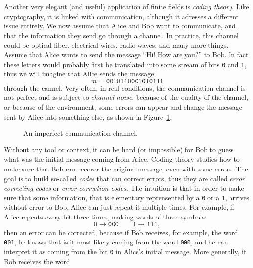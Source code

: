 Another very elegant (and useful) application of finite fields is
\emph{coding theory}. Like cryptography, it is linked with communication,
although it adresses a different issue entirely. We now assume that Alice and
Bob want to communicate, and that the information they send go through a
channel. In practice, this channel could be optical fiber, electrical wires, radio
waves, and many more things. Assume that Alice wants to send the message ``Hi!
How are you?'' to Bob. In fact these letters would probably first be translated
into some stream of bits \texttt{0} and \texttt{1}, thus we will imagine that
Alice sends the message
\[
  m = \texttt{0010110001010111}
\]
through the cannel. Very often, in real conditions, the communication channel is
not perfect and is subject to \emph{channel noise}, \ie because of the quality of
the channel, or because of the environment, some errors can appear and change
the message sent by Alice into something else, as shown in
Figure~\ref{fig:communication-channel}.
\begin{figure}[h]
  \centering
  \caption{An imperfect communication channel.}
  \label{fig:communication-channel}
\end{figure}
Without any tool or context, it can be hard (or impossible) for Bob to guess
what was the initial message coming from Alice. Coding theory studies how to
make sure that Bob can recover the original message, even with some errors. The
goal is to build so-called \emph{codes} that can correct errors,
thus they are called \emph{error correcting codes} or \emph{error correction
codes}. The intuition is that in order to make sure that some
information, that is elementary reprensented by a \texttt{0} or a
\texttt{1}, arrives without error to Bob, Alice can just repeat it multiple
times. For example, if Alice repeats every bit three times, making words of
three symbols:
\[
  \texttt{0}\to\texttt{000}\quad\quad\texttt{1}\to\texttt{111},
\]
then an error can be corrected, because if Bob receives, for example, the
word \texttt{001}, he knows that is it most likely coming from
the word \texttt{000}, and he can interpret it as coming from the bit \texttt{0} in
Alice's initial message. More generally, if Bob receives the word

